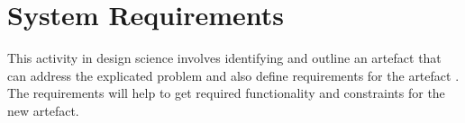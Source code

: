 \section{System Requirements}
This activity in design science involves identifying and outline an artefact that can address the explicated problem and also define requirements for the artefact \cite{johannesson2012design}. The requirements will help to get required functionality and constraints for the new artefact. 

%
%



